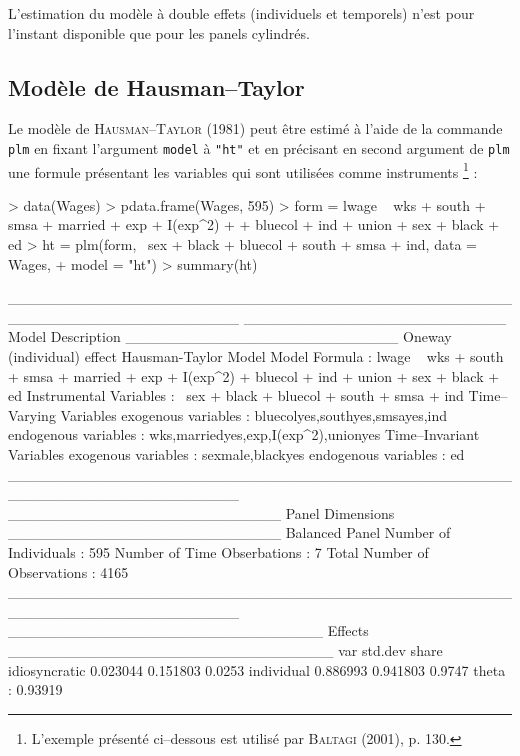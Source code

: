\documentclass[a4paper]{article}
\begin{document}
L'estimation du modèle à double effets (individuels et temporels)
n'est pour l'instant disponible que pour les panels cylindrés.


\subsection{Modèle de Hausman--Taylor}

Le modèle de \textsc{Hausman}--\textsc{Taylor} (1981) peut être estimé à l'aide de la commande
\texttt{plm} en fixant l'argument \texttt{model} à \texttt{"ht"} et en
précisant en second argument de \texttt{plm} une formule présentant les variables qui sont utilisées comme instruments
\footnote{L'exemple présenté ci--dessous est utilisé par
  \textsc{Baltagi} (2001), p. 130.} :


\begin{Schunk}
\begin{Sinput}
> data(Wages)
> pdata.frame(Wages, 595)
> form = lwage ~ wks + south + smsa + married + exp + I(exp^2) + 
+     bluecol + ind + union + sex + black + ed
> ht = plm(form, ~sex + black + bluecol + south + smsa + ind, data = Wages, 
+     model = "ht")
> summary(ht)
\end{Sinput}
\begin{Soutput}
______________________________________________________________________ 
_________________________ Model Description __________________________
Oneway (individual) effect
Hausman-Taylor Model
Model Formula             : lwage ~ wks + south + smsa + married + 
                                exp + I(exp^2) + bluecol + ind + 
                                union + sex + black + ed
Instrumental Variables    : ~sex + black + bluecol + south + 
                                smsa + ind
Time--Varying Variables    
    exogenous variables   :  bluecolyes,southyes,smsayes,ind 
    endogenous variables  :  wks,marriedyes,exp,I(exp^2),unionyes 
Time--Invariant Variables  
    exogenous variables   :  sexmale,blackyes 
    endogenous variables  :  ed 
______________________________________________________________________ 
__________________________ Panel Dimensions __________________________
Balanced Panel
Number of Individuals        :  595
Number of Time Obserbations  :  7
Total Number of Observations :  4165
______________________________________________________________________ 
______________________________ Effects _______________________________
                   var  std.dev  share
idiosyncratic 0.023044 0.151803 0.0253
individual    0.886993 0.941803 0.9747
theta   :  0.93919  

\end{Soutput}
\end{Schunk}
\end{document}
